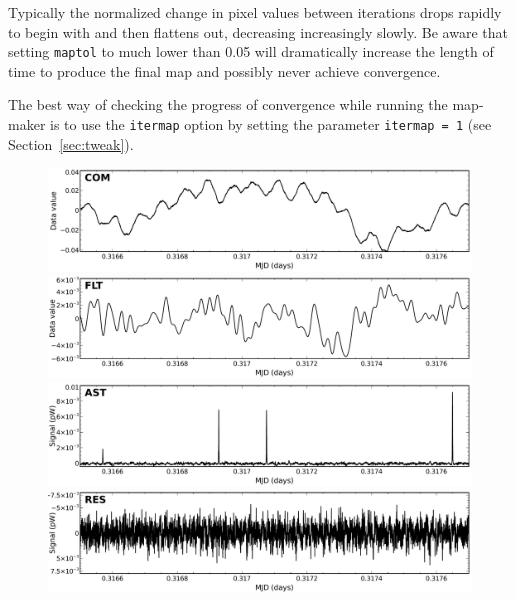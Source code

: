 \documentclass[twoside,11pt]{article}
\newcommand{\htmlref}[2]{#1}
\newenvironment{latexonly}{}{}
\newcommand{\latexhtml}[2]{#1}
\renewcommand{\_}{\texttt{\symbol{95}}}
\newcommand{\param}[1]{\texttt{#1}}
\newcommand{\cref}[3]{\latexhtml{#1~\ref{#2}}{\htmlref{#3}{#2}}}
\begin{document}
Typically the normalized change in pixel values between iterations
drops rapidly to begin with and then flattens out, decreasing
increasingly slowly.  Be aware that setting \texttt{maptol} to much
lower than 0.05 will dramatically increase the length of time to
produce the final map and possibly never achieve convergence.
\vspace{2mm}


The best way of checking the progress of convergence while running the
map-maker is to use the \param{itermap} option by setting the parameter
\param{itermap~=~1} (see \cref{Section}{sec:tweak}{Tweaking the
configuration file}).

\begin{figure}
\begin{center}
\begin{latexonly}
  \includegraphics[width=\linewidth]{sc21_com} \\
  \includegraphics[width=\linewidth]{sc21_flt} \\
  \includegraphics[width=\linewidth]{sc21_ast} \\
  \includegraphics[width=\linewidth]{sc21_res} \\

\end{latexonly}
\end{center}
\end{figure}
\end{document}
